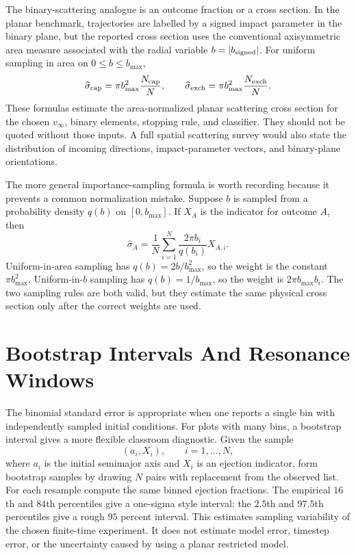 The binary-scattering analogue is an outcome fraction or a cross section.  In
the planar benchmark, trajectories are labelled by a signed impact parameter
in the binary plane, but the reported cross section uses the conventional
axisymmetric area measure associated with the radial variable \(b=|b_{\rm
signed}|\).  For uniform sampling in area on \(0\le b\le b_{\max}\),
\[
  \widehat\sigma_{\rm cap}
  =
  \pi b_{\max}^2\frac{N_{\rm cap}}{N},
  \qquad
  \widehat\sigma_{\rm exch}
  =
  \pi b_{\max}^2\frac{N_{\rm exch}}{N}.
\]
These formulas estimate the area-normalized planar scattering cross section for
the chosen \(v_\infty\), binary elements, stopping rule, and classifier.  They
should not be quoted without those inputs.  A full spatial scattering survey
would also state the distribution of incoming directions, impact-parameter
vectors, and binary-plane orientations.

The more general importance-sampling formula is worth recording because it
prevents a common normalization mistake.  Suppose \(b\) is sampled from a
probability density \(q(b)\) on \([0,b_{\max}]\).  If \(X_A\) is the indicator
for outcome \(A\), then
\[
  \widehat\sigma_A
  =
  \frac1N\sum_{i=1}^N
  \frac{2\pi b_i}{q(b_i)}X_{A,i}.
\]
Uniform-in-area sampling has \(q(b)=2b/b_{\max}^2\), so the weight is the
constant \(\pi b_{\max}^2\).  Uniform-in-\(b\) sampling has
\(q(b)=1/b_{\max}\), so the weight is \(2\pi b_{\max}b_i\).  The two sampling
rules are both valid, but they estimate the same physical cross section only
after the correct weights are used.

\section{Bootstrap Intervals And Resonance Windows}
\label{sec:three-body-bootstrap-resonance-windows}

The binomial standard error is appropriate when one reports a single bin with
independently sampled initial conditions.  For plots with many bins, a
bootstrap interval gives a more flexible classroom diagnostic.  Given the
sample
\[
        (a_i,X_i),\qquad i=1,\dots,N,
\]
where \(a_i\) is the initial semimajor axis and \(X_i\) is an ejection
indicator, form bootstrap samples by drawing \(N\) pairs with replacement from
the observed list.  For each resample compute the same binned ejection
fractions.  The empirical \(16\)th and \(84\)th percentiles give a one-sigma
style interval; the \(2.5\)th and \(97.5\)th percentiles give a rough
\(95\) percent interval.  This estimates sampling variability of the chosen
finite-time experiment.  It does not estimate model error, timestep error, or
the uncertainty caused by using a planar restricted model.

